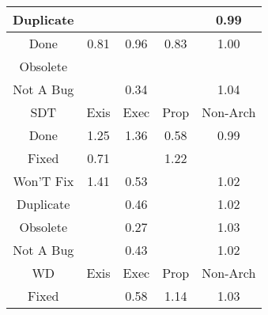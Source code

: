 \begin{tabular}{|c||c|c|c|c|}
\hline
Duplicate &  &  &  & \cellcolor[rgb]{0.9081925890100925,0.8314449213144378,0.41831308307608633} 0.99 \\ 
\hline
Done & \cellcolor[rgb]{0.8788261232195881,0.6924436499060502,0.39090438167161556} 0.81 & \cellcolor[rgb]{0.9034828908232931,0.8091523498969208,0.4139173647684069} 0.96 & \cellcolor[rgb]{0.8811952896611142,0.7036577043959399,0.39311560368370646} 0.83 & \cellcolor[rgb]{0.9090617019483628,0.8395555430281718,0.42} 1.00 \\ 
\hline
Obsolete &  &  &  &  \\ 
\hline
Not A Bug &  & \cellcolor[rgb]{0.8007397375661,0.32283475781287285,0.3180237550616932} 0.34 &  & \cellcolor[rgb]{0.9011411388747992,0.835803697361747,0.42} 1.04 \\ 
\hline
\hline
SDT & Exis & Exec & Prop & Non-Arch \\ 
\hline
Done & \cellcolor[rgb]{0.8513330511763775,0.8122103926624945,0.42} 1.25 & \cellcolor[rgb]{0.8234214849361743,0.7989891244434509,0.42} 1.36 & \cellcolor[rgb]{0.8401837132334631,0.5095362426383919,0.3548381323512322} 0.58 & \cellcolor[rgb]{0.9078222529830451,0.8296919974530801,0.41796743611750875} 0.99 \\ 
\hline
Fixed & \cellcolor[rgb]{0.8613436821401033,0.6096934287964884,0.37458743666409633} 0.71 &  & \cellcolor[rgb]{0.8563890266222941,0.814605328400034,0.42} 1.22 &  \\ 
\hline
Won'T Fix & \cellcolor[rgb]{0.8125578149380777,0.7938431754969841,0.42} 1.41 & \cellcolor[rgb]{0.8318081883652746,0.4698920915956329,0.3470209758075896} 0.53 &  & \cellcolor[rgb]{0.9063058243703251,0.8382501273333117,0.42} 1.02 \\ 
\hline
Duplicate &  & \cellcolor[rgb]{0.8194850997921307,0.41156280568275183,0.3355194264726553} 0.46 &  & \cellcolor[rgb]{0.9055103595964282,0.837873328229887,0.42} 1.02 \\ 
\hline
Obsolete &  & \cellcolor[rgb]{0.788414102279739,0.2644934174574313,0.3065198287944231} 0.27 &  & \cellcolor[rgb]{0.9035703957249167,0.8369543979749605,0.42} 1.03 \\ 
\hline
Not A Bug &  & \cellcolor[rgb]{0.8149184306512858,0.3899472384160858,0.3312572019412} 0.43 &  & \cellcolor[rgb]{0.9041396660310465,0.8372240523304957,0.42} 1.02 \\ 
\hline
\hline
WD & Exis & Exec & Prop & Non-Arch \\ 
\hline
Fixed &  & \cellcolor[rgb]{0.8400569624680583,0.508936289015476,0.35471983163685444} 0.58 & \cellcolor[rgb]{0.8767709237815607,0.8242599112649498,0.42} 1.14 & \cellcolor[rgb]{0.9039853676465036,0.837150963622028,0.42} 1.03 \\ 

\end{tabular}

